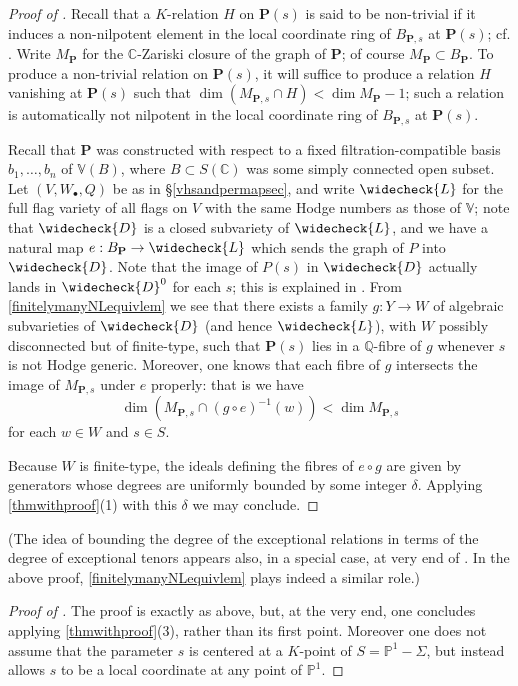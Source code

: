 \documentclass[10pt]{article}
\numberwithin{equation}{section}
\theoremstyle{plain}
\theoremstyle{definition}
\theoremstyle{remark}
\newcommand{\ch}[1]{\widecheck{{#1}}}
\newcommand{\C}{\mathbb{C}}
\newcommand{\V}{\mathbb{V}}
\begin{document}
\begin{proof}[Proof of ]
Recall that a $K$-relation $H$ on $\mathbf{P}(s)$ is said to be non-trivial if it induces a non-nilpotent element in the local coordinate ring of $B_{\mathbf{P},s}$ at $\mathbf{P}(s)$; cf. . Write $M_{\mathbf{P}}$ for the $\mathbb{C}$-Zariski closure of the graph of $\mathbf{P}$; of course $M_{\mathbf{P}} \subset B_{\mathbf{P}}$. To produce a non-trivial relation on $\mathbf{P}(s)$, it will suffice to produce a relation $H$ vanishing at $\mathbf{P}(s)$ such that $\dim(M_{\mathbf{P},s} \cap H) < \dim M_{\mathbf{P}} - 1$; such a relation is automatically not nilpotent in the local coordinate ring of $B_{\mathbf{P},s}$ at $\mathbf{P}(s)$. 

Recall that $\mathbf{P}$ was constructed with respect to a fixed filtration-compatible basis $b_{1}, \hdots, b_{n}$ of $\V(B)$, where $B \subset S(\C)$ was some simply connected open subset. Let $(V, W_{\bullet}, Q)$ be as in \S\ref{vhsandpermapsec}, and write $\ch{L}$ for the full flag variety of all flags on $V$ with the same Hodge numbers as those of $\V$; note that $\ch{D}$ is a closed subvariety of $\ch{L}$, and we have a natural map $e : B_{\mathbf{P}} \to \ch{L}$ which sends the graph of $P$ into $\ch{D}$. Note that the image of $P(s)$ in $\ch{D}$ actually lands in $\ch{D}^{0}$ for each $s$; this is explained in \cite[\S4.6]{2024arXiv240616628B}. From \autoref{finitelymanyNLequivlem} we see that there exists a family $g : Y \to W$ of algebraic subvarieties of $\ch{D}$ (and hence $\ch{L}$), with $W$ possibly disconnected but of finite-type, such that $\mathbf{P}(s)$ lies in a $\mathbb{Q}$-fibre of $g$ whenever $s$ is not Hodge generic. Moreover, one knows that each fibre of $g$ intersects the image of $M_{\mathbf{P},s}$ under $e$ properly: that is we have
\[ \dim (M_{\mathbf{P},s} \cap (g \circ e)^{-1}(w)) < \dim M_{\mathbf{P},s} \]
for each $w \in W$ and $s \in S$.

Because $W$ is finite-type, the ideals defining the fibres of $e \circ g$ are given by generators whose degrees are uniformly bounded by some integer $\delta$. Applying \autoref{thmwithproof}(1) with this $\delta$ we may conclude.
\end{proof}
(The idea of bounding the degree of the exceptional relations in terms of the degree of exceptional tenors appears also, in a special case, at very end of \cite[(page 58)]{zbMATH00764346}.  In the above proof, \autoref{finitelymanyNLequivlem} plays indeed a similar role.)


\begin{proof}[Proof of ]
    The proof is exactly as above, but, at the very end, one concludes applying \autoref{thmwithproof}(3), rather than its first point. Moreover one does not assume that the parameter $s$ is centered at a $K$-point of $S = \mathbb{P}^1 - \Sigma$, but instead allows $s$ to be a local coordinate at any point of $\mathbb{P}^1$.
\end{proof}
\end{document}
